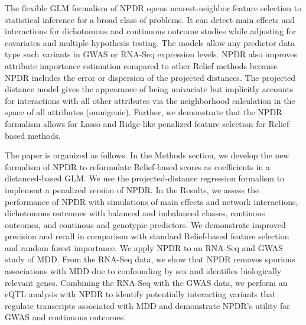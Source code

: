 \documentclass{bioinfo}
\begin{document}
The flexible GLM formalism of NPDR opens nearest-neighbor feature selection to statistical inference for a broad class of problems.
It can detect main effects and interactions for dichotomous and continuous outcome studies while adjusting for covariates and multiple hypothesis testing.
The models allow any predictor data type such variants in GWAS or RNA-Seq expression levels.
NPDR also improves attribute importance estimation compared to other Relief methods because NPDR includes the error or dispersion of the projected distances.
The projected distance model gives the appearance of being univariate but implicitly accounts for interactions with all other attributes via the neighborhood calculation in the space of all attributes (omnigenic).
Further, we demonstrate that the NPDR formalism allows for Lasso and Ridge-like penalized feature selection for Relief-based methods.

The paper is organized as follows.
In the Methods section, we develop the new formalism of NPDR to reformulate Relief-based scores as coefficients in a distanced-based GLM.
We use the projected-distance regression formalism to implement a penalized version of NPDR.
In the Results, we assess the performance of NPDR with simulations of main effects and network interactions, dichotomous outcomes with balanced and imbalanced classes, continous outcomes, and continous and genotypic predictors. We demonstrate improved precision and recall in comparison with standard Relief-based feature selection and random forest importance.
We apply NPDR to an RNA-Seq and GWAS study of MDD.
From the RNA-Seq data, we show that NPDR removes spurious associations with MDD due to confounding by sex and identifies biologically relevant genes.
Combining the RNA-Seq with the GWAS data, we perform an eQTL analysis with NPDR to identify potentially interacting variants that regulate transcripts associated with MDD and demonstrate NPDR's utility for GWAS and continuous outcomes.

\end{document}
